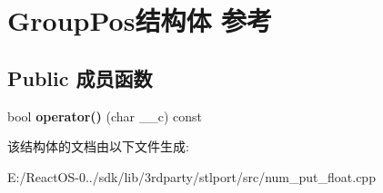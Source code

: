 \hypertarget{struct_group_pos}{}\section{Group\+Pos结构体 参考}
\label{struct_group_pos}
\subsection*{Public 成员函数}
\begin{DoxyCompactItemize}
\item 
\mbox{\label{struct_group_pos_adba712e21e71587ce8d7fde14354a88f}} 
bool {\bfseries operator()} (char \+\_\+\+\_\+c) const
\end{DoxyCompactItemize}


该结构体的文档由以下文件生成\+:\begin{DoxyCompactItemize}
\item 
E\+:/\+React\+O\+S-\/0../sdk/lib/3rdparty/stlport/src/num\+\_\+put\+\_\+float.\+cpp\end{DoxyCompactItemize}
